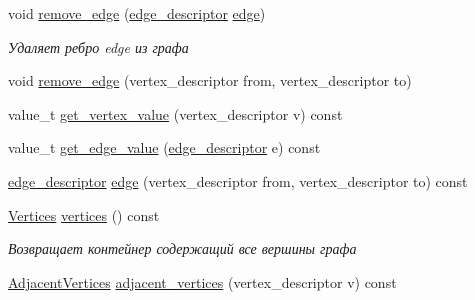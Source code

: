 \begin{DoxyCompactItemize}
void \hyperlink{class_s_p_u___g_r_a_p_h_1_1_spu_ultra_graph_ad1cfb4a7f1b4fecc6b2ef5d3d3af39bc}{remove\+\_\+edge} (\hyperlink{class_s_p_u___g_r_a_p_h_1_1_spu_ultra_graph_a5f3776e003ef0a1648f1d9f84289810b}{edge\+\_\+descriptor} \hyperlink{class_s_p_u___g_r_a_p_h_1_1_spu_ultra_graph_a51468aa2278d3abb0c338ffbeac7747a}{edge})
\begin{DoxyCompactList}\small\item\em Удаляет ребро edge из графа \end{DoxyCompactList}\item 
void \hyperlink{class_s_p_u___g_r_a_p_h_1_1_spu_ultra_graph_a25193f9b7e0b9df947d8e9bc82da6fdf}{remove\+\_\+edge} (vertex\+\_\+descriptor from, vertex\+\_\+descriptor to)
\item 
value\+\_\+t \hyperlink{class_s_p_u___g_r_a_p_h_1_1_spu_ultra_graph_a3b4f0766c244af3081a37d61fdf2faae}{get\+\_\+vertex\+\_\+value} (vertex\+\_\+descriptor v) const
\item 
value\+\_\+t \hyperlink{class_s_p_u___g_r_a_p_h_1_1_spu_ultra_graph_aa508f7947fae83893eb2eacab3631ec2}{get\+\_\+edge\+\_\+value} (\hyperlink{class_s_p_u___g_r_a_p_h_1_1_spu_ultra_graph_a5f3776e003ef0a1648f1d9f84289810b}{edge\+\_\+descriptor} e) const
\item 
\hyperlink{class_s_p_u___g_r_a_p_h_1_1_spu_ultra_graph_a5f3776e003ef0a1648f1d9f84289810b}{edge\+\_\+descriptor} \hyperlink{class_s_p_u___g_r_a_p_h_1_1_spu_ultra_graph_a51468aa2278d3abb0c338ffbeac7747a}{edge} (vertex\+\_\+descriptor from, vertex\+\_\+descriptor to) const
\item 
\mbox{\label{class_s_p_u___g_r_a_p_h_1_1_spu_ultra_graph_ab2227b9c29b84b1fa6e2a10f11af5df6}} 
\hyperlink{class_s_p_u___g_r_a_p_h_1_1_spu_ultra_graph_1_1_vertices}{Vertices} \hyperlink{class_s_p_u___g_r_a_p_h_1_1_spu_ultra_graph_ab2227b9c29b84b1fa6e2a10f11af5df6}{vertices} () const
\begin{DoxyCompactList}\small\item\em Возвращает контейнер содержащий все вершины графа \end{DoxyCompactList}\item 
\mbox{\label{class_s_p_u___g_r_a_p_h_1_1_spu_ultra_graph_a54da90f2ff56cd153a0b23521316e24d}} 
\hyperlink{class_s_p_u___g_r_a_p_h_1_1_spu_ultra_graph_1_1_adjacent_vertices}{Adjacent\+Vertices} \hyperlink{class_s_p_u___g_r_a_p_h_1_1_spu_ultra_graph_a54da90f2ff56cd153a0b23521316e24d}{adjacent\+\_\+vertices} (vertex\+\_\+descriptor v) const

\end{DoxyCompactItemize}

